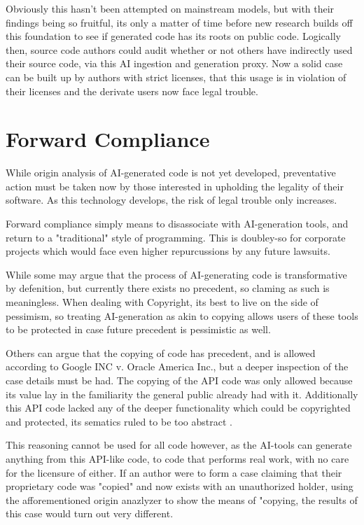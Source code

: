 \documentclass[journal]{IEEEtran}
\begin{document}
Obviously this hasn't been attempted on mainstream models, but
with their findings being so fruitful, its only a matter of time
before new research builds off this foundation to see if
generated code has its roots on public code. Logically then,
source code authors could audit whether or not others have indirectly used their
source code, via this AI ingestion and generation proxy. Now a solid case
can be built up by authors with strict licenses, that this usage is
in violation of their licenses and the derivate users now face
legal trouble.

\section{Forward Compliance}

While origin analysis of AI-generated code is not yet developed, preventative
action must be taken now by those interested in upholding the legality of their
software. As this technology develops, the risk of legal trouble only increases.

Forward compliance simply means to disassociate with AI-generation tools, and
return to a "traditional" style of programming. This is doubley-so for corporate
projects which would face even higher repurcussions by any future lawsuits.

While some may argue that the process of AI-generating code is transformative by
defenition, but currently there exists no precedent, so claming as such is meaningless.
When dealing with Copyright, its best to live on the side of pessimism, so
treating AI-generation as akin to copying allows users of these tools
to be protected in case future precedent is pessimistic as well. 

Others can argue that the copying of code has precedent, and is allowed according
to Google INC v. Oracle America Inc., but a deeper inspection of the case details must
be had. The copying of the API code was only allowed because its value lay
in the familiarity the general public already had with it. Additionally this API code
lacked any of the deeper functionality which could be copyrighted and protected, its sematics
ruled to be too abstract \cite{harvard}.

This reasoning cannot be used for all code however,
as the AI-tools can generate anything from this API-like code, to code that performs
real work, with no care for the licensure of either. If an author were to form a case
claiming that their proprietary code was "copied" and now exists with an unauthorized
holder, using the afforementioned origin anazlyzer to show the means of "copying,
the results of this case would turn out very different.
\end{document}
